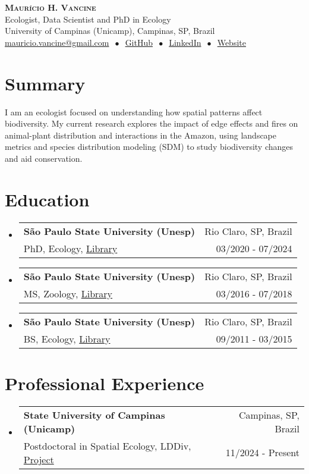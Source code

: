 \documentclass[letterpaper,11pt]{article}
\makeatletter
\newcommand{\cvheading}[4]{
  \vspace{-2pt}\item
    \begin{tabular*}{\textwidth}[t]{l@{\extracolsep{\fill}}r}
      \textbf{#1} & #2\\
      \small#3 & \small #4\\
    \end{tabular*}\vspace{-7pt}
}
\newcommand{\cvheadingstart}{\begin{itemize}[leftmargin=0in, label={}]}
\newcommand{\cvheadingend}{\end{itemize}}
\makeatother
\begin{document}
\begin{center}
  \textbf{\LARGE\scshape Maurício H. Vancine}\\
  \vspace{5pt}\small
  Ecologist, Data Scientist and PhD in Ecology\\
  University of Campinas (Unicamp), Campinas, SP, Brazil\\
  \href{mailto:}{mauricio.vancine@gmail.com}
  $\ \bullet\ $ 
  \href{https://github.com/mauriciovancine}{GitHub}
  $\ \bullet\ $
  \href{https://www.linkedin.com/in/mauricio-vancine/}{LinkedIn}
    $\ \bullet\ $
  \href{https://mauriciovancine.github.io}{Website}
\end{center}

\section{Summary}
I am an ecologist focused on understanding how spatial patterns affect biodiversity. My current research explores the impact of edge effects and fires on animal-plant distribution and interactions in the Amazon, using landscape metrics and species distribution modeling (SDM) to study biodiversity changes and aid conservation.

\section{Education}
\cvheadingstart
  \cvheading
    {São Paulo State University (Unesp)}{Rio Claro, SP, Brazil}
    {PhD, Ecology, \href{https://hdl.handle.net/11449/256726}{Library}}{03/2020 - 07/2024}
  \cvheading
    {São Paulo State University (Unesp)}{Rio Claro, SP, Brazil}
    {MS, Zoology, \href{http://hdl.handle.net/11449/154993}{Library}}{03/2016 - 07/2018}
  \cvheading
    {São Paulo State University (Unesp)}{Rio Claro, SP, Brazil}
    {BS, Ecology, \href{http://hdl.handle.net/11449/138991}{Library}}{09/2011 - 03/2015}
\cvheadingend

\section{Professional Experience}
\cvheadingstart
  \cvheading
    {State University of Campinas (Unicamp)}{Campinas, SP, Brazil}
    {Postdoctoral in Spatial Ecology, LDDiv, \href{https://bv.fapesp.br/pt/auxilios/113861/interacoes-entre-plantas-e-animais-e-os-impactos-em-cascata-da-fragmentacao-da-floresta-amazonica/}{Project}}{11/2024 - Present}
\cvheadingend
\end{document}
